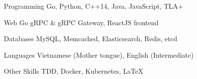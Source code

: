 


\begin{cvskills}


\cvskill
{Programming} %
{Go, Python, C++14, Java, JavaScript, TLA+} %


\cvskill
{Web} %
{Go gRPC \& gRPC Gateway, ReactJS frontend} %

\cvskill
{Databases} %
{MySQL, Memcached, Elasticsearch, Redis, etcd} %


\cvskill
{Languages} %
{Vietnamese (Mother tongue), English (Intermediate)} %


\cvskill
{Other Skills} %
{TDD, Docker, Kubernetes, LaTeX}%


\end{cvskills}
